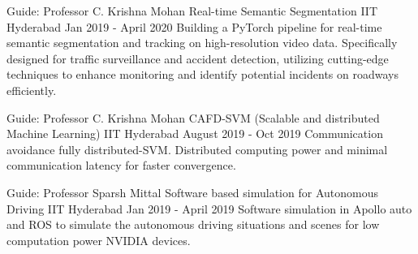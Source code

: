 

\begin{cventries}
\vspace{-1mm}

  \cventry
    {Guide: Professor C. Krishna Mohan} %
    {Real-time Semantic Segmentation} %
    {IIT Hyderabad} %
    {Jan 2019 - April 2020} %
    {
      Building a PyTorch pipeline for real-time semantic segmentation and tracking on high-resolution video data. Specifically designed for traffic surveillance and accident detection, utilizing cutting-edge techniques to enhance monitoring and identify potential incidents on roadways efficiently.
    }

  \cventry
    {Guide: Professor C. Krishna Mohan} %
    {CAFD-SVM (Scalable and distributed Machine Learning)} %
    {IIT Hyderabad} %
    {August 2019 - Oct 2019} %
    {
      Communication avoidance fully distributed-SVM. Distributed computing power and minimal communication latency for faster convergence.
    }

  \cventry
    {Guide: Professor Sparsh Mittal} %
    {Software based simulation for Autonomous Driving} %
    {IIT Hyderabad} %
    {Jan 2019 - April 2019} %
    {
      Software simulation in Apollo auto and ROS to simulate the autonomous driving situations and scenes for low computation power NVIDIA devices.
    }


\end{cventries}

\vspace{-2mm}